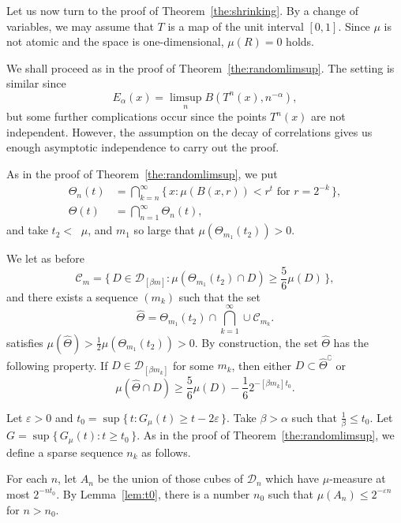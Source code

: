 \documentclass[11pt]{article}
\theoremstyle{definition}
\numberwithin{equation}{section}
\numberwithin{figure}{section}
\numberwithin{table}{section}
\DeclareMathOperator{\udimh}{\overline{dim}_H}
\begin{document}
Let us now turn to the proof of Theorem~\ref{the:shrinking}. By a change of variables, we may assume that $T$ is a map of the unit interval $[0,1]$. Since $\mu$ is not atomic and the space is one-dimensional, $\mu (R) = 0$ holds.

We shall proceed as in the proof of Theorem~\ref{the:randomlimsup}. The setting is similar since
\[
E_\alpha (x) = \limsup_n B(T^n (x), n^{-\alpha}),
\]
but some further complications occur since the points $T^n (x)$ are not independent. However, the assumption on the decay of correlations gives us enough asymptotic independence to carry out the proof.

As in the proof of Theorem~\ref{the:randomlimsup}, we put
\begin{align*}
\Theta_n (t) &= \bigcap_{k=n}^\infty \{\, x : \mu (B(x,r)) < r^t
\text{ for } r = 2^{- k} \,\}, \\ \Theta (t) &= \bigcap_{n=1}^\infty
\Theta_n (t),
\end{align*}
and take $t_2 < \udimh \mu$, and $m_1$ so large that $\mu (\Theta_{m_1} (t_2)) > 0$.

We let as before
\[
\mathscr{C}_m = \{\, D \in \mathscr{D}_{[\beta m]} : \mu (\Theta_{m_1} (t_2) \cap D) \geq \frac{5}{6} \mu (D) \,\},
\]
and there exists a sequence $(m_k)$ such that the set
\[
\hat{\Theta} = \Theta_{m_1} (t_2) \cap \bigcap_{k=1}^\infty \cup
\mathscr{C}_{m_k}.
\]
satisfies $\mu (\hat{\Theta}) > \frac{1}{2} \mu (\Theta_{m_1} (t_2)) > 0$. By construction, the set $\hat{\Theta}$ has the following property. If $D \in \mathscr{D}_{[\beta m_k]}$ for some $m_k$, then either $D \subset \hat{\Theta}^\complement$ or
\begin{equation}\label{eq:propertyofDelta2}
\mu (\hat{\Theta} \cap D) \geq \frac{5}{6} \mu (D) - \frac{1}{6} 2^{-[\beta m_k]t_0}.
\end{equation}

Let $\varepsilon > 0$ and $t_0 = \sup \{\, t: G_\mu (t) \geq t - 2
\varepsilon \,\}$. Take $\beta > \alpha$ such that $\frac{1}{\beta}
\leq t_0$. Let $G = \sup \{\, G_\mu (t) : t \geq t_0 \,\}$. As in the proof of Theorem~\ref{the:randomlimsup}, we define a sparse sequence $n_k$ as follows.

For each $n$, let $A_n$ be the union of those cubes of $\mathscr{D}_n$ which have $\mu$-measure at most $2^{-n t_0}$. By Lemma~\ref{lem:t0}, there is a number $n_0$ such that $\mu (A_n) \leq 2^{-\varepsilon n}$ for $n > n_0$.
\end{document}
